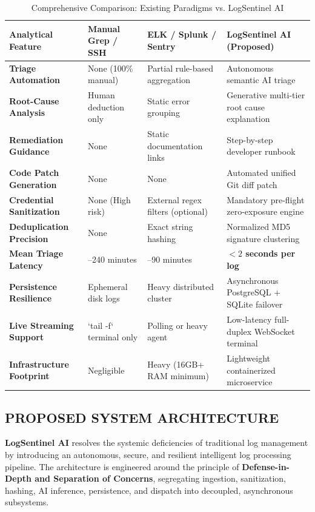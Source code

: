 \documentclass[12pt,a4paper]{article}
\begin{document}
\begin{table}[H]
\centering
\caption{Comprehensive Comparison: Existing Paradigms vs. LogSentinel AI}
\label{tab:comparative_analysis_deep}
\renewcommand{\arraystretch}{1.3}
\begin{tabularx}{\textwidth}{|>{\raggedright\arraybackslash}p{3.2cm}|>{\raggedright\arraybackslash}p{3.8cm}|>{\raggedright\arraybackslash}p{3.8cm}|>{\raggedright\arraybackslash}X|}
\hline
\textbf{Analytical Feature} & \textbf{Manual Grep / SSH} & \textbf{ELK / Splunk / Sentry} & \textbf{LogSentinel AI (Proposed)} \\
\hline
\textbf{Triage Automation} & None (100\% manual) & Partial rule-based aggregation & Autonomous semantic AI triage \\
\hline
\textbf{Root-Cause Analysis} & Human deduction only & Static error grouping & Generative multi-tier root cause explanation \\
\hline
\textbf{Remediation Guidance} & None & Static documentation links & Step-by-step developer runbook \\
\hline
\textbf{Code Patch Generation} & None & None & Automated unified Git diff patch \\
\hline
\textbf{Credential Sanitization} & None (High risk) & External regex filters (optional) & Mandatory pre-flight zero-exposure engine \\
\hline
\textbf{Deduplication Precision} & None & Exact string hashing & Normalized MD5 signature clustering \\
\hline
\textbf{Mean Triage Latency} & 120--240 minutes & 45--90 minutes & \textbf{$< 2$ seconds per log} \\
\hline
\textbf{Persistence Resilience} & Ephemeral disk logs & Heavy distributed cluster & Asynchronous PostgreSQL + SQLite failover \\
\hline
\textbf{Live Streaming Support} & `tail -f` terminal only & Polling or heavy agent & Low-latency full-duplex WebSocket terminal \\
\hline
\textbf{Infrastructure Footprint} & Negligible & Heavy (16GB+ RAM minimum) & Lightweight containerized microservice \\
\hline
\end{tabularx}
\end{table}

\clearpage
\subsection{PROPOSED SYSTEM ARCHITECTURE}\label{sec:proposed_system}
\textbf{LogSentinel AI} resolves the systemic deficiencies of traditional log management by introducing an autonomous, secure, and resilient intelligent log processing pipeline. The architecture is engineered around the principle of \textbf{Defense-in-Depth and Separation of Concerns}, segregating ingestion, sanitization, hashing, AI inference, persistence, and dispatch into decoupled, asynchronous subsystems.
\end{document}
